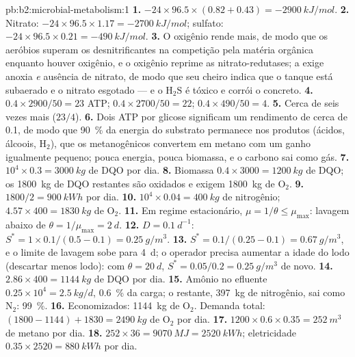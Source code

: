 \begin{solution}{pb:b2:microbial-metabolism:1}
\textbf{1.} $-24\times 96.5\times (0.82 + 0.43) = \qty{-2900}{kJ/mol}$.
\textbf{2.} Nitrato: $-24\times 96.5\times 1.17 = \qty{-2700}{kJ/mol}$;
sulfato: $-24\times 96.5\times 0.21 = \qty{-490}{kJ/mol}$.
\textbf{3.} O oxigênio rende mais, de modo que os aeróbios superam os
desnitrificantes na competição pela matéria orgânica enquanto houver
oxigênio, e o oxigênio reprime as nitrato-redutases; a  exige anoxia \emph{e} ausência de nitrato, de modo que seu
cheiro indica que o tanque está subaerado e o nitrato esgotado --- e o
$\mathrm{H_2S}$ é tóxico e corrói o concreto.
\textbf{4.} $0.4\times 2900/50 = 23$ ATP; $0.4\times 2700/50 = 22$;
$0.4\times 490/50 = 4$.
\textbf{5.} Cerca de seis vezes mais ($23/4$).
\textbf{6.} Dois ATP por glicose significam um rendimento de cerca de
\num{0.1}, de modo que \qty{90}{\%} da energia do substrato permanece
nos produtos (ácidos, álcoois, $\mathrm{H_2}$), que os metanogênicos
convertem em metano com um ganho igualmente pequeno; pouca energia,
pouca biomassa, e o carbono sai como gás.
\textbf{7.} $10^4\times 0.3 = \qty{3000}{kg}$ de DQO por dia.
\textbf{8.} Biomassa $0.4\times 3000 = \qty{1200}{kg}$ de DQO; os
\qty{1800}{kg} de DQO restantes são oxidados e exigem \qty{1800}{kg}
de $\mathrm{O_2}$.
\textbf{9.} $1800/2 = \qty{900}{kWh}$ por dia.
\textbf{10.} $10^4\times 0.04 = \qty{400}{kg}$ de nitrogênio;
$4.57\times 400 = \qty{1830}{kg}$ de $\mathrm{O_2}$.
\textbf{11.} Em regime estacionário, $\mu = 1/\theta \le \mu_{\max}$:
lavagem abaixo de $\theta = 1/\mu_{\max} = \qty{2}{d}$.
\textbf{12.} $D = \qty{0.1}{d^{-1}}$: $S^* = 1\times 0.1/(0.5 - 0.1)
= \qty{0.25}{g/m^3}$.
\textbf{13.} $S^* = 0.1/(0.25 - 0.1) = \qty{0.67}{g/m^3}$, e o limite
de lavagem sobe para \qty{4}{d}; o operador precisa aumentar a idade
do lodo (descartar menos lodo): com $\theta = \qty{20}{d}$, $S^* =
0.05/0.2 = \qty{0.25}{g/m^3}$ de novo.
\textbf{14.} $2.86\times 400 = \qty{1144}{kg}$ de DQO por dia.
\textbf{15.} Amônio no efluente $0.25\times 10^4 = \qty{2.5}{kg/d}$,
\qty{0.6}{\%} da carga; o restante, \qty{397}{kg} de nitrogênio, sai
como $\mathrm{N_2}$: \qty{99}{\%}.
\textbf{16.} Economizados: \qty{1144}{kg} de $\mathrm{O_2}$. Demanda
total: $(1800 - 1144) + 1830 = \qty{2490}{kg}$ de $\mathrm{O_2}$ por
dia.
\textbf{17.} $1200\times 0.6\times 0.35 = \qty{252}{m^3}$ de metano
por dia.
\textbf{18.} $252\times 36 = \qty{9070}{MJ} = \qty{2520}{kWh}$;
eletricidade $0.35\times 2520 = \qty{880}{kWh}$ por dia.

\end{solution}
